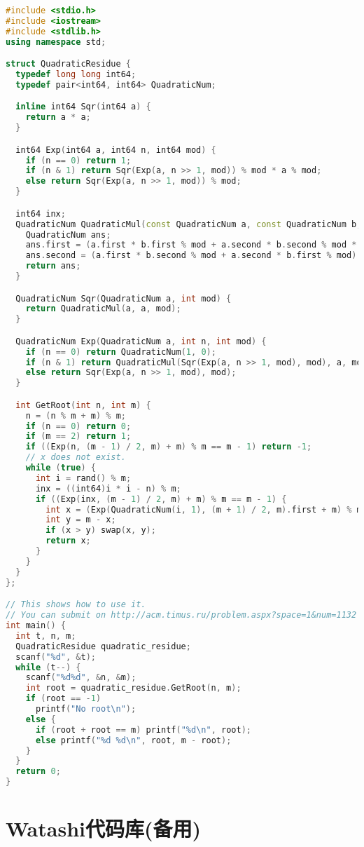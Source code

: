 \begin{lstlisting}[language=C++]
#include <stdio.h>
#include <iostream>
#include <stdlib.h>
using namespace std;

struct QuadraticResidue {
  typedef long long int64;
  typedef pair<int64, int64> QuadraticNum;

  inline int64 Sqr(int64 a) {
    return a * a;
  }

  int64 Exp(int64 a, int64 n, int64 mod) {
    if (n == 0) return 1;
    if (n & 1) return Sqr(Exp(a, n >> 1, mod)) % mod * a % mod;
    else return Sqr(Exp(a, n >> 1, mod)) % mod;
  }

  int64 inx;
  QuadraticNum QuadraticMul(const QuadraticNum a, const QuadraticNum b, const int mod) {
    QuadraticNum ans;
    ans.first = (a.first * b.first % mod + a.second * b.second % mod * inx % mod) % mod;
    ans.second = (a.first * b.second % mod + a.second * b.first % mod) % mod;
    return ans;
  }

  QuadraticNum Sqr(QuadraticNum a, int mod) {
    return QuadraticMul(a, a, mod);
  }

  QuadraticNum Exp(QuadraticNum a, int n, int mod) {
    if (n == 0) return QuadraticNum(1, 0);
    if (n & 1) return QuadraticMul(Sqr(Exp(a, n >> 1, mod), mod), a, mod);
    else return Sqr(Exp(a, n >> 1, mod), mod);
  }

  int GetRoot(int n, int m) {
    n = (n % m + m) % m;
    if (n == 0) return 0;
    if (m == 2) return 1;
    if ((Exp(n, (m - 1) / 2, m) + m) % m == m - 1) return -1;
    // x does not exist.
    while (true) {
      int i = rand() % m;
      inx = ((int64)i * i - n) % m;
      if ((Exp(inx, (m - 1) / 2, m) + m) % m == m - 1) {
        int x = (Exp(QuadraticNum(i, 1), (m + 1) / 2, m).first + m) % m;
        int y = m - x;
        if (x > y) swap(x, y);
        return x;
      }
    }
  }
};

// This shows how to use it. 
// You can submit on http://acm.timus.ru/problem.aspx?space=1&num=1132
int main() {
  int t, n, m;
  QuadraticResidue quadratic_residue;
  scanf("%d", &t);
  while (t--) {
    scanf("%d%d", &n, &m);
    int root = quadratic_residue.GetRoot(n, m);
    if (root == -1)
      printf("No root\n");
    else {
      if (root + root == m) printf("%d\n", root);
      else printf("%d %d\n", root, m - root);
    }
  }
  return 0;
}

\end{lstlisting}
\section{Watashi代码库(备用)}
